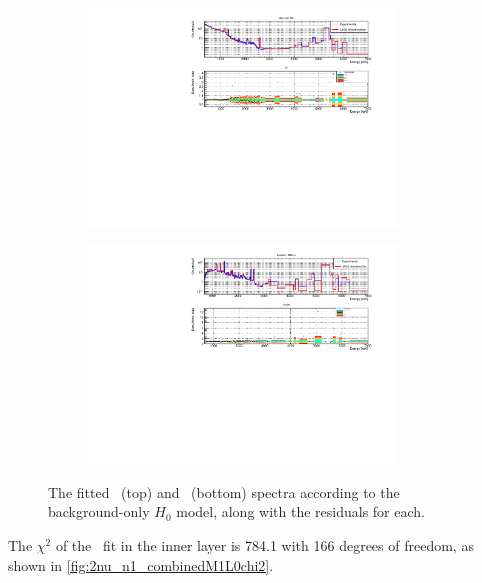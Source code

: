 \begin{figure}[htbp]
\begin{subfigure}[t]{\linewidth}
\includegraphics[width=0.9\textwidth]{Figures/2nu_M2.pdf}
\end{subfigure}
\par\bigskip\bigskip
\begin{subfigure}[t]{\linewidth}
\includegraphics[width=0.9\textwidth]{Figures/2nu_M2sum.pdf}
\end{subfigure}
\caption[The fitted \Mtwo~and \Msum~spectra according to the $H_0$ model]
{The fitted \Mtwo~(top) and \Msum~(bottom) spectra according to the background-only $H_0$ model, along with the residuals for each.}
\label{fig:H0_fit_M2}
\end{figure}
The $\chi^2$ of the \Mone~fit in the inner layer is 784.1 with 166 degrees of freedom, as shown in \autoref{fig:2nu_n1_combinedM1L0chi2}.
